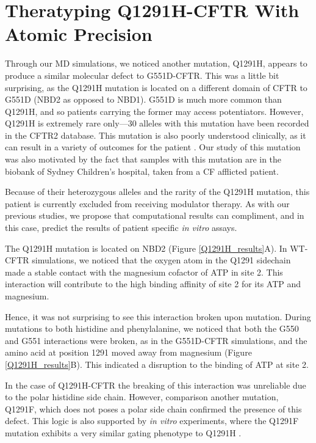 \section{Theratyping Q1291H-CFTR With Atomic Precision}

Through our MD simulations, we noticed another mutation, Q1291H, appears to produce a similar molecular defect to G551D-CFTR. This was a little bit surprising, as the Q1291H mutation is located on a different domain of CFTR to G551D (NBD2 as opposed to NBD1). G551D is much more common than Q1291H, and so patients carrying the former may access potentiators. However, Q1291H is extremely rare only---30 alleles with this mutation have been recorded in the CFTR2 database. This mutation is also poorly understood clinically, as it can result in a variety of outcomes for the patient \cite{cftr2}. Our study of this mutation was also motivated by the fact that samples with this mutation are in the biobank of Sydney Children's hospital, taken from a CF afflicted patient. 

Because of their heterozygous alleles and the rarity of the Q1291H mutation, this patient is currently excluded from receiving modulator therapy. As with our previous studies, we propose that computational results can compliment, and in this case, predict the results of patient specific \textit{in vitro} assays. 

The Q1291H mutation is located on NBD2 (Figure \ref{Q1291H_results}A). In WT-CFTR simulations, we noticed that the oxygen atom in the  Q1291 sidechain made a stable contact with the magnesium cofactor of ATP in site 2. This interaction will contribute to the high binding affinity of site 2 for its ATP and magnesium. 

Hence, it was not surprising to see this interaction broken upon mutation. During mutations to both histidine and phenylalanine, we noticed that both the G550 and G551 interactions were broken, as in the G551D-CFTR simulations, and the amino acid at position 1291 moved away from magnesium (Figure \ref{Q1291H_results}B). This indicated a disruption to the binding of ATP at site 2. 

In the case of Q1291H-CFTR the breaking of this interaction was unreliable due to the polar histidine side chain. However, comparison another mutation, Q1291F, which does not poses a polar side chain confirmed the presence of this defect. This logic is also supported by \textit{in vitro} experiments, where the Q1291F mutation exhibits a very similar gating phenotype to Q1291H \cite{dong2015}. 


